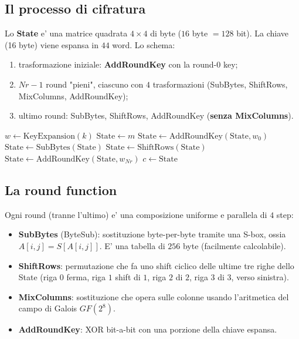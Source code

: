 \subsection{Il processo di cifratura}
Lo \textbf{State} e' una matrice quadrata $ 4 \times 4 $ di byte ($ 16 $ byte $ = 128 $ bit). La chiave (16 byte) viene espansa in $ 44 $ word. Lo schema:
\begin{enumerate}
  \item trasformazione iniziale: \textbf{AddRoundKey} con la round-0 key;
  \item $ Nr - 1 $ round "pieni", ciascuno con $ 4 $ trasformazioni (SubBytes, ShiftRows, MixColumns, AddRoundKey);
  \item ultimo round: SubBytes, ShiftRows, AddRoundKey (\textbf{senza MixColumns}).
\end{enumerate}
\begin{algorithm}
\caption{Cifratura AES}
$ w \gets \text{KeyExpansion}(k) $\;
$ \text{State} \gets m $\;
$ \text{State} \gets \text{AddRoundKey}(\text{State}, w_0) $\;
$ \text{State} \gets \text{SubBytes}(\text{State}) $\;
$ \text{State} \gets \text{ShiftRows}(\text{State}) $\;
$ \text{State} \gets \text{AddRoundKey}(\text{State}, w_{Nr}) $
\KwRet $ c \gets \text{State} $\;
\end{algorithm}

\subsection{La round function}
Ogni round (tranne l'ultimo) e' una composizione uniforme e parallela di $ 4 $ step:
\begin{itemize}
  \item \textbf{SubBytes} (ByteSub): sostituzione byte-per-byte tramite una S-box, ossia $ A[i,j] = S[A[i,j]] $. E' una tabella di $ 256 $ byte (facilmente calcolabile).
  \item \textbf{ShiftRows}: permutazione che fa uno shift ciclico delle ultime tre righe dello State (riga $ 0 $ ferma, riga $ 1 $ shift di $ 1 $, riga $ 2 $ di $ 2 $, riga $ 3 $ di $ 3 $, verso sinistra).
  \item \textbf{MixColumns}: sostituzione che opera sulle colonne usando l'aritmetica del campo di Galois $ GF(2^8) $.
  \item \textbf{AddRoundKey}: XOR bit-a-bit con una porzione della chiave espansa.
\end{itemize}


